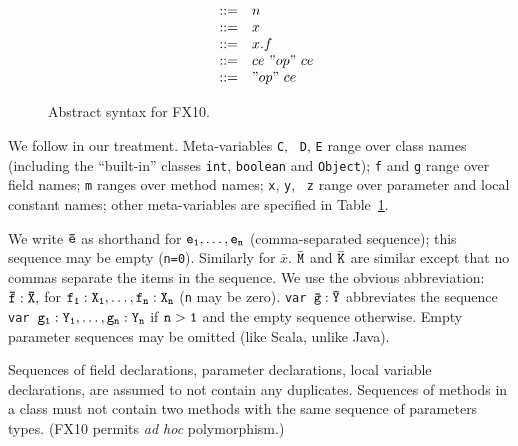 \documentclass[nocopyrightspace,preprint,10pt]{sigplanconf}
\newcommand\FXten{{\sf FX10}}
\begin{document}
\begin{figure}
\[\begin{array}{lrcll}
                         &       &{::=}& n                                                 & \\
                         &       &{::=}& x                                                 & \\
                         &       &{::=}& x.f                                               & \\
                         &       &{::=}& ce~"op"~ce                                        & \\
                         &       &{::=}& "op"~ce                                           & \\
\end{array}
\]

\caption{Abstract syntax for \FXten.}\label{Table:AST}
\end{figure}

We follow \cite{FJ,MJ} in our treatment. Meta-variables {\tt C}, {\tt
D}, {\tt E} range over class names (including the ``built-in'' classes
{\tt int}, {\tt boolean} and {\tt Object}); {\tt f} and {\tt g} range over
field names; {\tt m} ranges over method names; {\tt x}, {\tt y}, {\tt
z} range over parameter and local constant names; other meta-variables
are specified in Table~\ref{Table:AST}.

We write $\tt \bar{e}$ as shorthand for $\tt e_1,\ldots, e_n$
(comma-separated sequence); this sequence may be empty ({\tt n=0}).
Similarly for $\bar{x}$.
$\bar{\tt M}$ and $\bar{\tt K}$ are similar except that no commas
separate the items in the sequence. We use the obvious abbreviation:
$\tt\bar{\tt f}:\bar{X},$ for $\tt f_1:X_1,\ldots, f_n:X_n$
({\tt n} may be zero).  {\tt var $\tt\bar{\tt g}:\bar{\tt Y}$}
abbreviates the sequence {\tt var $\tt g_1:Y_1, \ldots, g_n:Y_n$} if
$\tt n > 1$ and the empty sequence otherwise. Empty parameter
sequences may be omitted (like Scala, unlike Java). 


Sequences of field declarations, parameter declarations, local
variable declarations, are assumed to not contain any duplicates.
Sequences of methods in a class must not contain two methods with the
same sequence of parameters types.  (\FXten{} permits {\em ad hoc}
polymorphism.)

\end{document}
